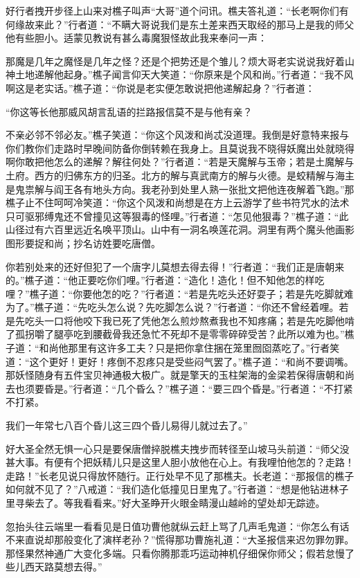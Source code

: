 \documentclass[12pt,UTF8]{ctexbook}
\begin{document}
好行者拽开步径上山来对樵子叫声“大哥”道个问讯。樵夫答礼道：“长老啊你们有何缘故来此？”行者道：“不瞒大哥说我们是东土差来西天取经的那马上是我的师父他有些胆小。适蒙见教说有甚么毒魔狠怪故此我来奉问一声：

那魔是几年之魔怪是几年之怪？还是个把势还是个雏儿？烦大哥老实说说我好着山神土地递解他起身。”樵子闻言仰天大笑道：“你原来是个风和尚。”行者道：“我不风啊这是老实话。”樵子道：“你说是老实便怎敢说把他递解起身？”行者道：

“你这等长他那威风胡言乱语的拦路报信莫不是与他有亲？

不亲必邻不邻必友。”樵子笑道：“你这个风泼和尚忒没道理。我倒是好意特来报与你们教你们走路时早晚间防备你倒转赖在我身上。且莫说我不晓得妖魔出处就晓得啊你敢把他怎么的递解？解往何处？”行者道：“若是天魔解与玉帝；若是土魔解与土府。西方的归佛东方的归圣。北方的解与真武南方的解与火德。是蛟精解与海主是鬼祟解与阎王各有地头方向。我老孙到处里人熟一张批文把他连夜解着飞跑。”那樵子止不住呵呵冷笑道：“你这个风泼和尚想是在方上云游学了些书符咒水的法术只可驱邪缚鬼还不曾撞见这等狠毒的怪哩。”行者道：“怎见他狠毒？”樵子道：“此山径过有六百里远近名唤平顶山。山中有一洞名唤莲花洞。洞里有两个魔头他画影图形要捉和尚；抄名访姓要吃唐僧。

你若别处来的还好但犯了一个唐字儿莫想去得去得！”行者道：“我们正是唐朝来的。”樵子道：“他正要吃你们哩。”行者道：“造化！造化！但不知他怎的样吃哩？”樵子道：“你要他怎的吃？”行者道：“若是先吃头还好耍子；若是先吃脚就难为了。”樵子道：“先吃头怎么说？先吃脚怎么说？”行者道：“你还不曾经着哩。若是先吃头一口将他咬下我已死了凭他怎么煎炒熬煮我也不知疼痛；若是先吃脚他啃了孤拐嚼了腿亭吃到腰截骨我还急忙不死却不是零零碎碎受苦？此所以难为也。”樵子道：“和尚他那里有这许多工夫？只是把你拿住捆在笼里囫囵蒸吃了。”行者笑道：“这个更好！更好！疼倒不忍疼只是受些闷气罢了。”樵子道：“和尚不要调嘴。那妖怪随身有五件宝贝神通极大极广。就是擎天的玉柱架海的金梁若保得唐朝和尚去也须要昏是。”行者道：“几个昏么？”樵子道：“要三四个昏是。”行者道：“不打紧不打紧。

我们一年常七八百个昏儿这三四个昏儿易得儿就过去了。”

好大圣全然无惧一心只是要保唐僧捽脱樵夫拽步而转径至山坡马头前道：“师父没甚大事。有便有个把妖精儿只是这里人胆小放他在心上。有我哩怕他怎的？走路！走路！”长老见说只得放怀随行。正行处早不见了那樵夫。长老道：“那报信的樵子如何就不见了？”八戒道：“我们造化低撞见日里鬼了。”行者道：“想是他钻进林子里寻柴去了。等我看看来。”好大圣睁开火眼金睛漫山越岭的望处却无踪迹。

忽抬头往云端里一看看见是日值功曹他就纵云赶上骂了几声毛鬼道：“你怎么有话不来直说却那般变化了演样老孙？”慌得那功曹施礼道：“大圣报信来迟勿罪勿罪。那怪果然神通广大变化多端。只看你腾那乖巧运动神机仔细保你师父；假若怠慢了些儿西天路莫想去得。”
\end{document}
